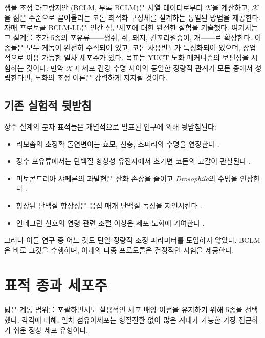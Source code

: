 \documentclass[12pt,a4paper]{article}
\newcommand{\REL}{\mathcal{K}}          %
\begin{document}
	생물 조정 라그랑지안 (BCLM, 부록 BCLM)은 서열 데이터로부터 \(\REL\)을 계산하고, \(\REL\)을 젊은 수준으로 끌어올리는 코돈 최적화 구성체를 설계하는 통일된 방법을 제공한다. 자매 프로토콜 BCLM‑LL은 인간 심근세포에 대한 완전한 실험을 기술했다. 여기서는 그 설계를 추가 5종의 포유류——생쥐, 쥐, 돼지, 긴꼬리원숭이, 개——로 확장한다. 이 종들은 모두 게놈이 완전히 주석되어 있고, 코돈 사용빈도가 특성화되어 있으며, 상업적으로 이용 가능한 일차 세포주가 있다. 목표는 YUCT 노화 메커니즘의 보편성을 시험하는 것이다: 만약 \(\REL\)과 세포 건강 수명 사이의 동일한 정량적 관계가 모든 종에서 성립한다면, 노화의 조정 이론은 강력하게 지지될 것이다.
	
	\subsection{기존 실험적 뒷받침}
	장수 설계의 분자 표적들은 개별적으로 발표된 연구에 의해 뒷받침된다:
	\begin{itemize}
		\item 리보솜의 초정확 돌연변이는 효모, 선충, 초파리의 수명을 연장한다 \cite{Bjedov2021}.
		\item 장수 포유류에서는 단백질 항상성 유전자에서 초가변 코돈의 고갈이 관찰된다 \cite{Kerekes2025}.
		\item 미토콘드리아 샤페론의 과발현은 산화 손상을 줄이고 \textit{Drosophila}의 수명을 연장한다 \cite{Morrow2004}.
		\item 향상된 단백질 항상성은 응집 매개 단백질 독성을 지연시킨다 \cite{Walker2003}.
		\item 인테그린 신호의 연령 관련 조절 이상은 세포 노화에 기여한다 \cite{Takeda2019}.
	\end{itemize}
	그러나 이들 연구 중 어느 것도 단일 정량적 조정 파라미터를 도입하지 않았다. BCLM은 바로 그것을 수행하며, 아래의 다종 프로토콜은 결정적인 시험을 제공한다.
	
	\section{표적 종과 세포주}
	\label{sec:species}
	넓은 계통 범위를 포괄하면서도 실용적인 세포 배양 이점을 유지하기 위해 5종을 선택했다. 각각에 대해, 일차 섬유아세포는 형질전환 없이 많은 계대가 가능한 가장 접근하기 쉬운 정상 세포 유형이다.
	
\end{document}
